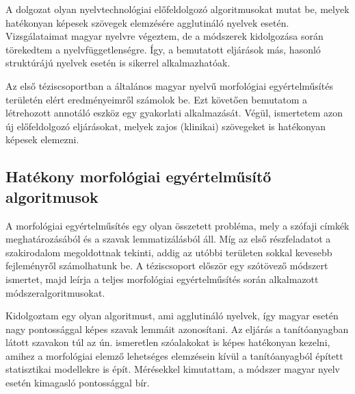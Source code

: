 \let\oldthesubsection=\thesubsection
\renewcommand{\thesubsection}{\Roman{subsection}}

A dolgozat olyan nyelvtechnológiai előfeldolgozó algoritmusokat mutat be, melyek hatékonyan képesek szövegek elemzésére agglutináló nyelvek esetén. 
Vizsgálataimat magyar nyelvre végeztem, de a módszerek kidolgozása során törekedtem a nyelvfüggetlenségre. 
Így, a bemutatott eljárások más, hasonló struktúrájú nyelvek esetén is sikerrel alkalmazhatóak.

Az első téziscsoportban a általános magyar nyelvű morfológiai egyértelműsítés területén elért eredményeimről számolok be. 
Ezt követően bemutatom a létrehozott annotáló eszköz egy gyakorlati alkalmazását. 
Végül, ismertetem azon új előfeldolgozó eljárásokat, melyek zajos (klinikai) szövegeket is hatékonyan képesek elemezni.

\subsection{Hatékony morfológiai egyértelműsítő algoritmusok}
\label{thes:morf}

A morfológiai egyértelműsítés egy olyan összetett probléma, mely a szófaji címkék meghatározásából és a szavak lemmatizálásból áll. 
Míg az első részfeladatot a szakirodalom megoldottnak tekinti, addig az utóbbi területen sokkal kevesebb fejleményről számolhatunk be. 
A téziscsoport először egy szótövező módszert ismertet, majd leírja a teljes morfológiai egyértelműsítés során alkalmazott módszeralgoritmusokat.

\begin{core}
\begin{thesis}\label{thes:morf-lemma}
Kidolgoztam egy olyan algoritmust, ami agglutináló nyelvek, így magyar esetén nagy pontossággal képes szavak lemmáit azonosítani. 
Az eljárás a tanítóanyagban látott szavakon túl az ún. ismeretlen szóalakokat is képes hatékonyan kezelni, amihez a morfológiai elemző lehetséges elemzésein kívül a tanítóanyagból épített statisztikai modellekre is épít. 
Mérésekkel kimutattam, a módszer magyar nyelv esetén kimagasló pontossággal bír. 
\end{thesis} 

\begin{pub}
\cite{Orosz2011,Orosz2012,Orosz2012a,Orosz2013a}
\end{pub}
\end{core}

